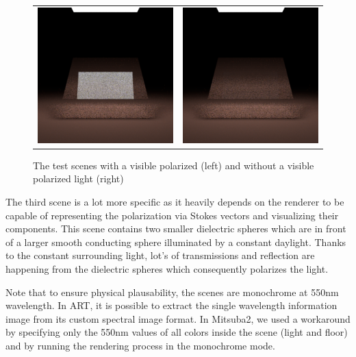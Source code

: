 \begin{figure}[h]
	\begin{tabular}{cc}
		\includegraphics[width=.45\linewidth]{img/polarizing_plane_90.png}
		&
		\includegraphics[width=.45\linewidth]{img/polarizing_plane_0.png}
	\end{tabular}
	\caption{The test scenes with a visible polarized (left) and without a visible polarized light (right)}
	\label{fig:polar_planes}
\end{figure}

The third scene is a lot more specific as it heavily depends on the renderer to be capable of representing the polarization via Stokes vectors and visualizing their components. This scene contains two smaller dielectric spheres which are in front of a larger smooth conducting sphere illuminated by a constant daylight. Thanks to the constant surrounding light, lot's of transmissions and reflection are happening from the dielectric spheres which consequently polarizes the light.

Note that to ensure physical plausability, the scenes are monochrome at 550nm wavelength. In ART, it is possible to extract the single wavelength information image from its custom spectral image format. In Mitsuba2, we used a workaround by specifying only the 550nm values of all colors inside the scene (light and floor) and by running the rendering process in the monochrome mode.

